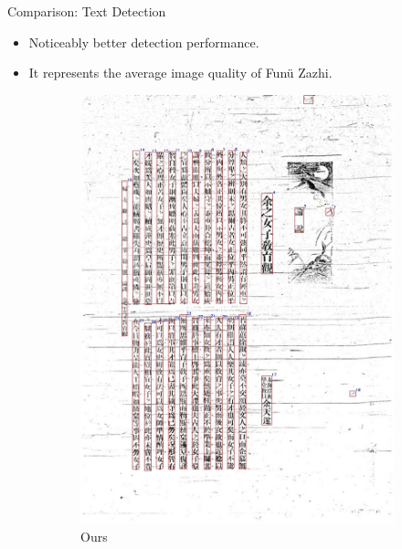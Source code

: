 \documentclass{beamer}
\begin{document}
\begin{frame}
    \begin{center}
        \Large{Comparison: Text Detection}
    \end{center}
    \begin{itemize}
        \item Noticeably better detection performance.
        \item It represents the average image quality of Funü Zazhi.
    \end{itemize}
    \begin{figure}[htbp]
        \centering
        \begin{subfigure}[b]{0.23\linewidth}
            \includegraphics[width=\linewidth]{./figures/samples/ours_01.jpg}
            \caption{Ours}
            \label{fig:ours_01}
        \end{subfigure}
        \hfill
        \begin{subfigure}[b]{0.23\linewidth}

\end{subfigure}
\end{figure}
\end{frame}
\end{document}
